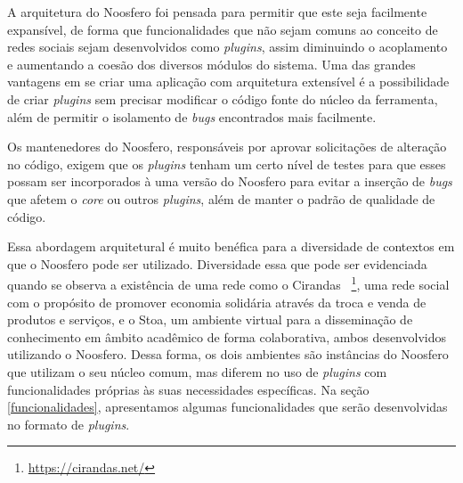 
A arquitetura do Noosfero foi pensada para permitir que este seja facilmente
expansível, de forma que funcionalidades que não sejam comuns ao conceito de
redes sociais sejam desenvolvidos como \textit{plugins}, assim diminuindo
o acoplamento e aumentando a coesão dos diversos módulos do sistema.
%
Uma das grandes vantagens em se criar uma aplicação com arquitetura extensível
é a possibilidade de criar \textit{plugins} sem precisar modificar o código
fonte do núcleo da ferramenta, além de permitir o isolamento de
\textit{bugs} encontrados mais facilmente.

Os mantenedores do Noosfero, responsáveis por aprovar solicitações de
alteração no código, exigem que os \textit{plugins} tenham um certo nível de
testes para que esses possam ser incorporados à uma versão do Noosfero para
evitar a inserção de \textit{bugs} que afetem o \textit{core} ou
outros \textit{plugins}, além de manter o padrão de qualidade de código.

Essa abordagem arquitetural é muito benéfica para a diversidade de contextos
em que o Noosfero pode ser utilizado. Diversidade essa que pode ser evidenciada
quando se observa a existência de uma rede como o Cirandas
~\footnote{\url{https://cirandas.net/}},
uma rede social com o propósito de promover economia solidária através
da troca e venda de produtos e serviços, e o
Stoa, um ambiente virtual para a disseminação de conhecimento em âmbito
acadêmico de forma colaborativa, ambos desenvolvidos utilizando o Noosfero.
%
Dessa forma, os dois ambientes são instâncias do Noosfero que utilizam o seu núcleo comum,
mas diferem no uso de \textit{plugins} com funcionalidades próprias às suas necessidades específicas.
%
Na seção \ref{funcionalidades}, apresentamos algumas funcionalidades que serão
desenvolvidas no formato de \textit{plugins}.


